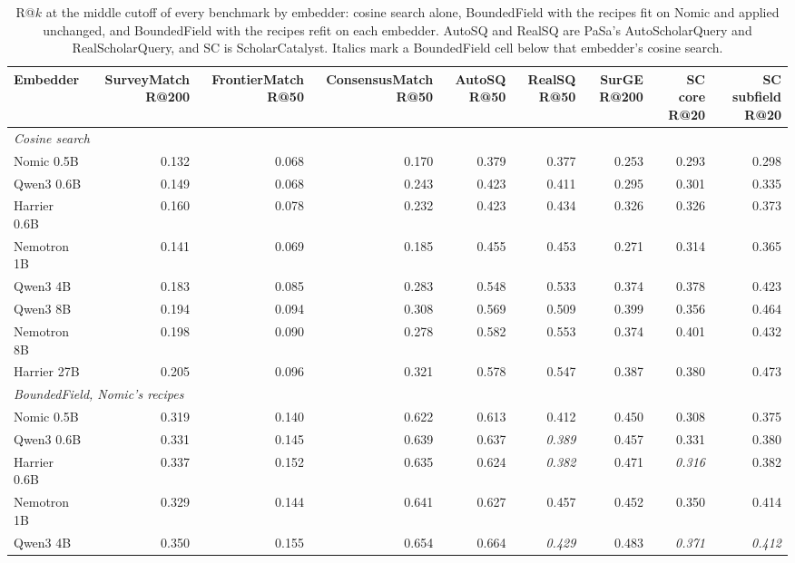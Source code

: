 \begin{table}[H]
\caption{R@$k$ at the middle cutoff of every benchmark by embedder: cosine search alone, BoundedField with the recipes fit on Nomic and applied unchanged, and BoundedField with the recipes refit on each embedder. AutoSQ and RealSQ are PaSa's AutoScholarQuery and RealScholarQuery, and SC is ScholarCatalyst. Italics mark a BoundedField cell below that embedder's cosine search.}
\label{tab:transfer}
\centering
\scriptsize
\setlength{\tabcolsep}{3pt}
\begin{tabular}{lrrrrrrrr}
\toprule
Embedder & SurveyMatch R@200 & FrontierMatch R@50 & ConsensusMatch R@50 & AutoSQ R@50 & RealSQ R@50 & SurGE R@200 & SC core R@20 & SC subfield R@20 \\
\midrule
\multicolumn{9}{l}{\textit{Cosine search}} \\
Nomic 0.5B & 0.132 & 0.068 & 0.170 & 0.379 & 0.377 & 0.253 & 0.293 & 0.298 \\
Qwen3 0.6B & 0.149 & 0.068 & 0.243 & 0.423 & 0.411 & 0.295 & 0.301 & 0.335 \\
Harrier 0.6B & 0.160 & 0.078 & 0.232 & 0.423 & 0.434 & 0.326 & 0.326 & 0.373 \\
Nemotron 1B & 0.141 & 0.069 & 0.185 & 0.455 & 0.453 & 0.271 & 0.314 & 0.365 \\
Qwen3 4B & 0.183 & 0.085 & 0.283 & 0.548 & 0.533 & 0.374 & 0.378 & 0.423 \\
Qwen3 8B & 0.194 & 0.094 & 0.308 & 0.569 & 0.509 & 0.399 & 0.356 & 0.464 \\
Nemotron 8B & 0.198 & 0.090 & 0.278 & 0.582 & 0.553 & 0.374 & 0.401 & 0.432 \\
Harrier 27B & 0.205 & 0.096 & 0.321 & 0.578 & 0.547 & 0.387 & 0.380 & 0.473 \\
\midrule
\multicolumn{9}{l}{\textit{BoundedField, Nomic's recipes}} \\
Nomic 0.5B & 0.319 & 0.140 & 0.622 & 0.613 & 0.412 & 0.450 & 0.308 & 0.375 \\
Qwen3 0.6B & 0.331 & 0.145 & 0.639 & 0.637 & \textit{0.389} & 0.457 & 0.331 & 0.380 \\
Harrier 0.6B & 0.337 & 0.152 & 0.635 & 0.624 & \textit{0.382} & 0.471 & \textit{0.316} & 0.382 \\
Nemotron 1B & 0.329 & 0.144 & 0.641 & 0.627 & 0.457 & 0.452 & 0.350 & 0.414 \\
Qwen3 4B & 0.350 & 0.155 & 0.654 & 0.664 & \textit{0.429} & 0.483 & \textit{0.371} & \textit{0.412} \\

\end{tabular}
\end{table}
